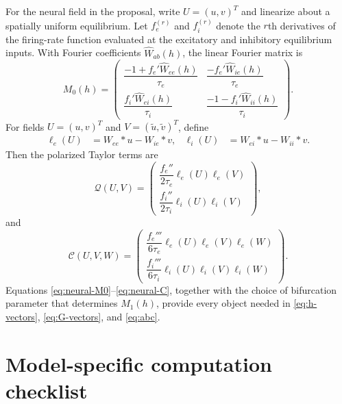 \documentclass[11pt]{article}
\newcommand{\cQ}{\mathcal{Q}}
\newcommand{\cC}{\mathcal{C}}
\begin{document}
For the neural field in the proposal, write $U=(u,v)^T$ and linearize about a
spatially uniform equilibrium.  Let $f_e^{(r)}$ and $f_i^{(r)}$ denote the
$r$th derivatives of the firing-rate function evaluated at the excitatory and
inhibitory equilibrium inputs.  With Fourier coefficients
$\widehat W_{ab}(h)$, the linear Fourier matrix is
\begin{equation}
M_0(h)=
\begin{pmatrix}
\dfrac{-1+f_e'\widehat W_{ee}(h)}{\tau_e}
&\dfrac{-f_e'\widehat W_{ie}(h)}{\tau_e}\\[6pt]
\dfrac{f_i'\widehat W_{ei}(h)}{\tau_i}
&\dfrac{-1-f_i'\widehat W_{ii}(h)}{\tau_i}
\end{pmatrix}.
\label{eq:neural-M0}
\end{equation}
For fields $U=(u,v)^T$ and $V=(\widetilde u,\widetilde v)^T$, define
\begin{align}
\ell_e(U)&=W_{ee}*u-W_{ie}*v,
&\ell_i(U)&=W_{ei}*u-W_{ii}*v.
\end{align}
Then the polarized Taylor terms are
\begin{equation}
\cQ(U,V)=
\begin{pmatrix}
\dfrac{f_e''}{2\tau_e}\ell_e(U)\ell_e(V)\\[5pt]
\dfrac{f_i''}{2\tau_i}\ell_i(U)\ell_i(V)
\end{pmatrix},
\label{eq:neural-Q}
\end{equation}
and
\begin{equation}
\cC(U,V,W)=
\begin{pmatrix}
\dfrac{f_e'''}{6\tau_e}\ell_e(U)\ell_e(V)\ell_e(W)\\[5pt]
\dfrac{f_i'''}{6\tau_i}\ell_i(U)\ell_i(V)\ell_i(W)
\end{pmatrix}.
\label{eq:neural-C}
\end{equation}
Equations \eqref{eq:neural-M0}--\eqref{eq:neural-C}, together with the choice
of bifurcation parameter that determines $M_1(h)$, provide every object needed
in \eqref{eq:h-vectors}, \eqref{eq:G-vectors}, and \eqref{eq:abc}.

\section{Model-specific computation checklist}
\end{document}
